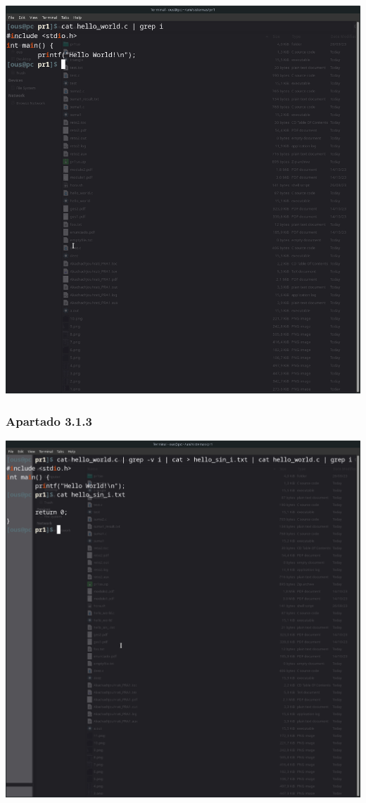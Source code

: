 \documentclass[spanish]{article}
\begin{document}
\begin{center}
\includegraphics[scale=.25]{../img/11.png}
\end{center}

\newpage

\subsubsection{Apartado 3.1.3}

\begin{center}
\includegraphics[scale=.25]{../img/12.png}
\end{center}
\end{document}
